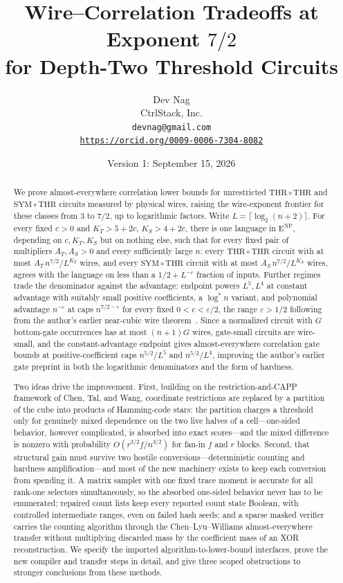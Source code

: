 \documentclass[11pt,letterpaper]{article}
\title{Wire--Correlation Tradeoffs at Exponent $7/2$\texorpdfstring{\\}{: }for Depth-Two Threshold Circuits}
\author{Dev Nag\\
CtrlStack, Inc.\\
\texttt{devnag@gmail.com}\\
\href{https://orcid.org/0009-0006-7304-8082}{\nolinkurl{https://orcid.org/0009-0006-7304-8082}}}
\date{Version 1: September 15, 2026}
\theoremstyle{definition}
\theoremstyle{remark}
\newcommand{\THR}{\mathrm{THR}}
\newcommand{\SYM}{\mathrm{SYM}}
\newcommand{\ENP}{\mathrm{E}^{\mathrm{NP}}}
\begin{document}
\hypersetup{pageanchor=false}
\begin{titlepage}
\maketitle
\thispagestyle{empty}
\begin{abstract}
We prove almost-everywhere correlation lower bounds for unrestricted
$\THR\circ\THR$ and $\SYM\circ\THR$ circuits measured by physical
wires, raising the wire-exponent frontier for these classes from $3$
to $7/2$, up to logarithmic factors. Write
$L=\lceil\log_2(n+2)\rceil$. For every fixed $c>0$ and $K_T>5+2c$,
$K_S>4+2c$, there is one language in $\ENP$, depending on $c,K_T,K_S$
but on nothing else, such that for every fixed pair of multipliers
$A_T,A_S>0$ and every sufficiently large $n$: every $\THR\circ\THR$
circuit with at most $A_T\,n^{7/2}/L^{K_T}$ wires, and every
$\SYM\circ\THR$ circuit with at most $A_S\,n^{7/2}/L^{K_S}$ wires,
agrees with the language on less than a $1/2+L^{-c}$ fraction of
inputs. Further regimes trade the denominator against the advantage:
endpoint powers $L^5,L^4$ at constant advantage with suitably small
positive coefficients, a $\log^*n$ variant, and polynomial advantage
$n^{-c}$ at caps $n^{7/2-\varepsilon}$ for every fixed
$0<c<\varepsilon/2$, the range $\varepsilon>1/2$ following from the
author's earlier near-cubic wire theorem~\cite{NagCubic}. Since a
normalized circuit with $G$ bottom-gate occurrences has at most
$(n+1)G$ wires, gate-small circuits are wire-small, and the
constant-advantage endpoint gives almost-everywhere correlation gate
bounds at positive-coefficient caps $n^{5/2}/L^{5}$ and
$n^{5/2}/L^{4}$, improving the author's earlier gate preprint in both
the logarithmic denominators and the form of hardness.

Two ideas drive the improvement. First, building on the
restriction-and-CAPP framework of Chen, Tal, and Wang, coordinate
restrictions are replaced by a partition of the cube into products of
Hamming-code stars: the partition charges a threshold only for
genuinely mixed dependence on the two live halves of a
cell---one-sided behavior, however complicated, is absorbed into
exact scores---and the mixed difference is nonzero with probability
$O(r^{3/2}f/n^{3/2})$ for fan-in $f$ and $r$ blocks. Second, that
structural gain must survive two hostile conversions---deterministic
counting and hardness amplification---and most of the new machinery
exists to keep each conversion from spending it. A matrix sampler
with one fixed trace moment is accurate for all rank-one selectors
simultaneously, so the absorbed one-sided behavior never has to be
enumerated; repaired count lists keep every reported count state
Boolean, with controlled intermediate ranges, even on failed hash
seeds; and a sparse masked verifier carries the counting algorithm
through the Chen--Lyu--Williams almost-everywhere transfer without
multiplying discarded mass by the coefficient mass of an XOR
reconstruction. We specify the imported algorithm-to-lower-bound
interfaces, prove the new compiler and transfer steps in detail, and
give three scoped obstructions to stronger conclusions from these
methods.
\end{abstract}
\end{titlepage}
\end{document}

